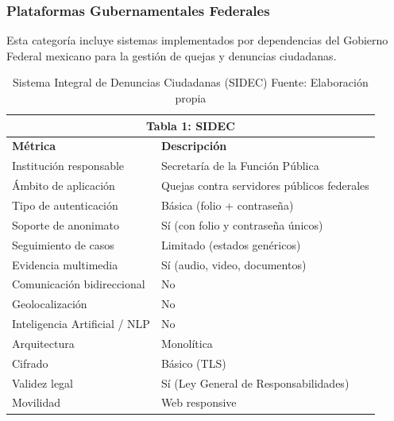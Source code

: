 \subsubsection{Plataformas Gubernamentales Federales}

\begin{flushleft}
\justifying
Esta categoría incluye sistemas implementados por dependencias del Gobierno Federal mexicano para la gestión de quejas y denuncias ciudadanas.
\end{flushleft}

\begin{table}[htbp]
\centering

\small
\begin{tabular}{|l|l|}
\hline \multicolumn{2}{|c|}{\textbf{Tabla 1: SIDEC}} \\
\hline \textbf{Métrica} & \textbf{Descripción} \\
\hline Institución responsable & Secretaría de la Función Pública \\
\hline Ámbito de aplicación & Quejas contra servidores públicos federales \\
\hline Tipo de autenticación & Básica (folio + contraseña) \\
\hline Soporte de anonimato & Sí (con folio y contraseña únicos) \\
\hline Seguimiento de casos & Limitado (estados genéricos) \\
\hline Evidencia multimedia & Sí (audio, video, documentos) \\
\hline Comunicación bidireccional & No \\
\hline Geolocalización & No \\
\hline Inteligencia Artificial / NLP & No \\
\hline Arquitectura & Monolítica \\
\hline Cifrado & Básico (TLS) \\
\hline Validez legal & Sí (Ley General de Responsabilidades) \\
\hline Movilidad & Web responsive \\
\hline \end{tabular}

\caption{Sistema Integral de Denuncias Ciudadanas (SIDEC) \footnotesize Fuente: Elaboración propia \cite{6,7,8} \label{tab:sidec} }
\end{table}



